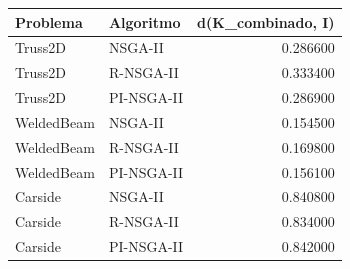 \begin{tabular}{llr}
\toprule
Problema & Algoritmo & d(K_combinado, I) \\
\midrule
Truss2D & NSGA-II & 0.286600 \\
Truss2D & R-NSGA-II & 0.333400 \\
Truss2D & PI-NSGA-II & 0.286900 \\
WeldedBeam & NSGA-II & 0.154500 \\
WeldedBeam & R-NSGA-II & 0.169800 \\
WeldedBeam & PI-NSGA-II & 0.156100 \\
Carside & NSGA-II & 0.840800 \\
Carside & R-NSGA-II & 0.834000 \\
Carside & PI-NSGA-II & 0.842000 \\
\bottomrule
\end{tabular}
